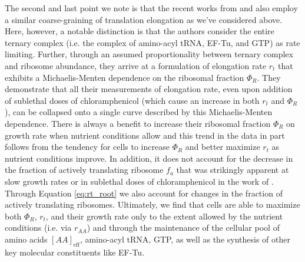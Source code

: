The second and last point we note is that the recent works from \cite{dai2016}
and \cite{klumpp2013} also employ a similar coarse-graining of translation
elongation as we've considered above. Here, however, a notable distinction is
that the authors consider the entire ternary complex (i.e. the complex of
amino-acyl tRNA, EF-Tu, and GTP) as rate limiting. Further, through an assumed
proportionality between ternary complex and ribosome abundance, they arrive at a
formulation of elongation rate $r_t$ that exhibits a Michaelis-Menten dependence
on the ribosomal fraction $\Phi_R$. They demonstrate that all their measurements
of elongation rate, even upon addition of sublethal doses of chloramphenicol
(which cause an increase in both $r_t$ and $\Phi_R$), can be collapsed onto a
single curve described by this Michaelis-Menten dependence. There is always a
benefit to increase their ribosomal fraction $\Phi_R$ on growth rate when
nutrient conditions allow and this trend in the data in part
follows from the tendency for cells to increase $\Phi_R$ and better maximize
$r_t$ as nutrient conditions improve.  In addition, it does not account for the
decrease in the fraction of actively translating ribosome $f_a$ that was
strikingly apparent at slow growth rates or in sublethal doses of
chloramphenicol in the work of \cite{dai2016}. Through Equation \ref{eq:rt_root}
we also account for changes in the fraction of actively translating ribosomes.
Ultimately, we find that cells are able to maximize both $\Phi_R$, $r_t$, and
their growth rate  only to the extent allowed by the nutrient conditions (i.e.
via $r_{AA}$) and through the maintenance of the cellular pool of amino acids
$[AA]_\text{eff}$, amino-acyl tRNA, GTP, as well as the synthesis of other key
molecular constituents like EF-Tu.
